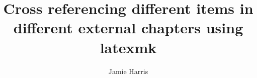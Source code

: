 \documentclass[]{article}
\title{Cross referencing different items in different external chapters using latexmk}
\author{Jamie Harris}
\begin{document}
\maketitle

\begin{abstract}
    
\end{abstract}



\end{document}
